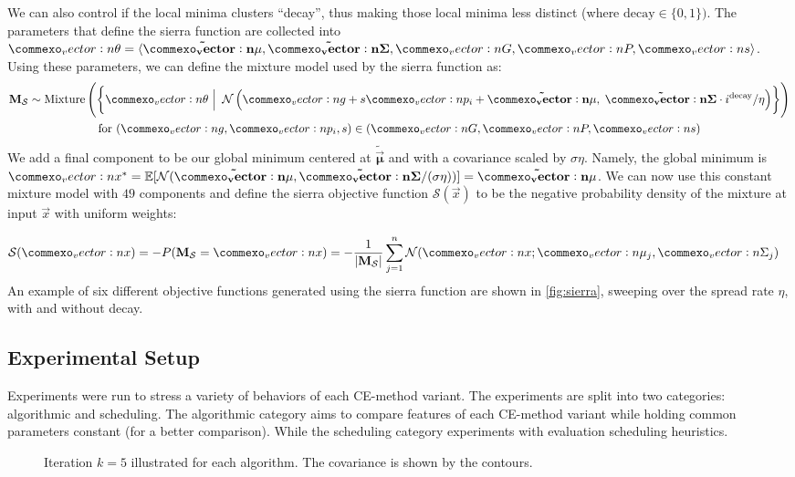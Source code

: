We can also control if the local minima clusters ``decay'', thus making those local minima less distinct (where $\text{decay} \in \{0, 1\})$.
The parameters that define the sierra function are collected into $\vec{\theta} = \langle \mathbf{\tilde{\vec{\mu}}}, \mathbf{\tilde{\mat{\Sigma}}}, \mat{G}, \mat{P}, \vec{s} \rangle$.
Using these parameters, we can define the mixture model used by the sierra function as:
\begin{gather*}
    \Sierra \sim \operatorname{Mixture}\left(\left\{ \vec{\theta} ~\Big|~ \Normal\left(\vec{g} +  s\vec{p}_i + \mathbf{\tilde{\vec{\mu}}},\; \mathbf{\tilde{\mat{\Sigma}}} \cdot i^{\text{decay}}/\eta \right) \right\} \right)\\
    \text{for } (\vec{g}, \vec{p}_i, s) \in (\mat{G}, \mat{P}, \vec{s})
\end{gather*}
We add a final component to be our global minimum centered at $\mathbf{\tilde{\vec{\mu}}}$ and with a covariance scaled by $\sigma\eta$. Namely, the global minimum is $\vec{x}^* = \E[\Normal(\mathbf{\tilde{\vec{\mu}}}, \mathbf{\tilde{\mat{\Sigma}}}/(\sigma\eta))] = \mathbf{\tilde{\vec{\mu}}}$.
We can now use this constant mixture model with $49$ components and define the sierra objective function $\mathcal{S}(\vec{x})$ to be the negative probability density of the mixture at input $\vec{x}$ with uniform weights:

\begin{align*}
    \mathcal{S}(\vec{x}) &= -P(\Sierra = \vec{x}) = -\frac{1}{|\Sierra|}\sum_{j=1}^{n}\Normal(\vec{x} ; \vec{\mu}_j, \mat{\Sigma}_j)
\end{align*}
An example of six different objective functions generated using the sierra function are shown in \cref{fig:sierra}, sweeping over the spread rate $\eta$, with and without decay.

\subsection{Experimental Setup} \label{sec:cem_experiment_setup}
Experiments were run to stress a variety of behaviors of each CE-method variant.
The experiments are split into two categories: algorithmic and scheduling.
The algorithmic category aims to compare features of each CE-method variant while holding common parameters constant (for a better comparison).
While the scheduling category experiments with evaluation scheduling heuristics.

\begin{figure*}[!t]
  \centering
  \caption{
    \label{fig:k5} Iteration $k=5$ illustrated for each algorithm. The covariance is shown by the contours.
  } 
\end{figure*}

